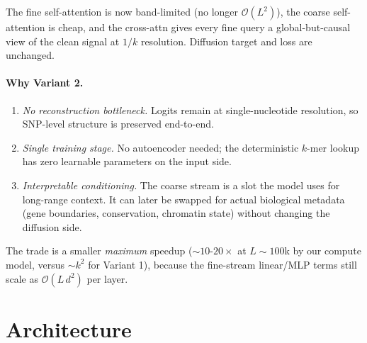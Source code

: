 \documentclass[11pt,a4paper]{article}
\begin{document}
The fine self-attention is now band-limited (no longer
\(\mathcal{O}(L^2)\)), the coarse self-attention is cheap, and the cross-attn
gives every fine query a global-but-causal view of the clean signal at
\(1/k\) resolution. Diffusion target and loss are unchanged.

\paragraph{Why Variant 2.}
\begin{enumerate}
  \item \emph{No reconstruction bottleneck.} Logits remain at single-nucleotide
        resolution, so SNP-level structure is preserved end-to-end.
  \item \emph{Single training stage.} No autoencoder needed; the deterministic
        \(k\)-mer lookup has zero learnable parameters on the input side.
  \item \emph{Interpretable conditioning.} The coarse stream is a slot the
        model uses for long-range context. It can later be swapped for
        actual biological metadata (gene boundaries, conservation, chromatin
        state) without changing the diffusion side.
\end{enumerate}
The trade is a smaller \emph{maximum} speedup (\(\sim\!10\)-\(20\times\) at
\(L\!\sim\!100\)k by our compute model, versus \(\sim k^2\) for Variant 1),
because the fine-stream linear/MLP terms still scale as
\(\mathcal{O}(L\,d^2)\) per layer.

\section{Architecture}
\end{document}
